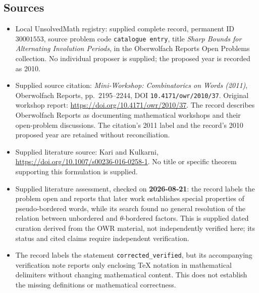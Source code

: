 \documentclass[11pt]{article}
\begin{document}
\subsection{Sources}
\begin{itemize}
\item Local UnsolvedMath registry: supplied complete record, permanent ID \(30001553\), source problem code \texttt{catalogue entry}, title \emph{Sharp Bounds for Alternating Involution Periods}, in the Oberwolfach Reports Open Problems collection. No individual proposer is supplied; the proposed year is recorded as 2010.
\item Supplied source citation: \emph{Mini-Workshop: Combinatorics on Words (2011)}, Oberwolfach Reports, pp.~2195--2244, DOI \texttt{10.4171/owr/2010/37}. Original workshop report: \url{https://doi.org/10.4171/owr/2010/37}. The record describes Oberwolfach Reports as documenting mathematical workshops and their open-problem discussions. The citation's 2011 label and the record's 2010 proposed year are retained without reconciliation.
\item Supplied literature source: Kari and Kulkarni, \url{https://doi.org/10.1007/s00236-016-0258-1}. No title or specific theorem supporting this formulation is supplied.
\item Supplied literature assessment, checked on \textbf{2026-08-21}: the record labels the problem open and reports that later work establishes special properties of pseudo-bordered words, while its search found no general resolution of the relation between unbordered and \(\theta\)-bordered factors. This is supplied dated curation derived from the OWR material, not independently verified here; its status and cited claims require independent verification.
\item The record labels the statement \texttt{corrected\_verified}, but its accompanying verification note reports only enclosing TeX notation in mathematical delimiters without changing mathematical content. This does not establish the missing definitions or mathematical correctness.
\end{itemize}
\end{document}
